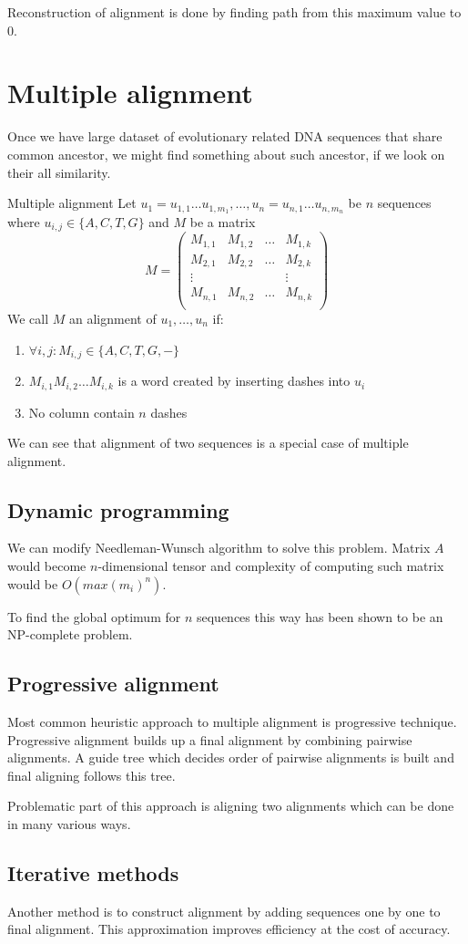 Reconstruction of alignment is done by finding path from this maximum value to $0$.

\section{Multiple alignment}
Once we have large dataset of evolutionary related DNA sequences that share common ancestor, we might find something about such ancestor, if we look on their all similarity.

\begin{definition}{Multiple alignment}
Let $u_1=u_{1,1} \dots u_{1,m_1}, \ldots, u_n=u_{n,1} \dots u_{n,m_n}$ be $n$ sequences where $u_{i,j} \in \{A, C, T, G\}$ and $M$ be a matrix
$$M=
\begin{pmatrix}
  M_{1,1} & M_{1,2} & \dots & M_{1,k} \\
  M_{2,1} & M_{2,2} & \dots & M_{2,k} \\
  \vdots&&&\vdots\\
  M_{n,1} & M_{n,2} & \dots & M_{n,k} \\
\end{pmatrix}$$
We call $M$ an alignment of $u_1, \dots, u_n$ if:
\begin{enumerate}
\item $\forall i,j : M_{i,j}\in \{A,C,T,G,-\}$
\item $M_{i,1} M_{i,2} \dots M_{i,k}$ is a word created by inserting dashes into $u_i$
\item No column contain $n$ dashes
\end{enumerate}
\end{definition}

We can see that alignment of two sequences is a special case of multiple alignment.

\subsection{Dynamic programming}
We can modify Needleman-Wunsch algorithm to solve this problem.
Matrix $A$ would become $n$-dimensional tensor and complexity of computing such matrix would be $O(max(m_i)^n)$.

To find the global optimum for $n$ sequences this way has been shown to be an NP-complete problem.\cite{wang1994complexity}

\subsection{Progressive alignment}
Most common heuristic approach to multiple alignment is progressive technique.
Progressive alignment builds up a final alignment by combining pairwise alignments.
A guide tree which decides order of pairwise alignments is built and final aligning follows this tree.

Problematic part of this approach is aligning two alignments which can be done in many various ways.

\subsection{Iterative methods}
Another method is to construct alignment by adding sequences one by one to final alignment.
This approximation improves efficiency at the cost of accuracy. 
